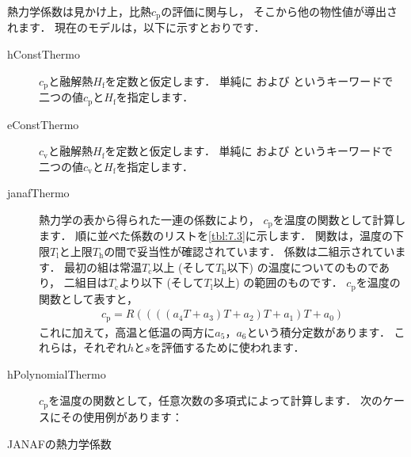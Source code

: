熱力学係数は見かけ上，比熱$c_{\mathrm{p}}$の評価に関与し，
そこから他の物性値が導出されます．
現在のモデルは，以下に示すとおりです．
\begin{description}
 \item[hConstThermo]
            $c_{\mathrm{p}}$と融解熱$H_{\mathrm{f}}$を定数と仮定します．
            単純に
%
%
            および
%
%
            というキーワードで
            二つの値$c_{\mathrm{p}}$と$H_{\mathrm{f}}$を指定します．
 \item[eConstThermo]
            $c_{\mathrm{v}}$と融解熱$H_{\mathrm{f}}$を定数と仮定します．
            単純に
%
%
            および
%
%
            というキーワードで
            二つの値$c_{\mathrm{v}}$と$H_{\mathrm{f}}$を指定します．
 \item[janafThermo]
            熱力学の表から得られた一連の係数により，
            $c_{\mathrm{p}}$を温度の関数として計算します．
            順に並べた係数のリストを\autoref{tbl:7.3}に示します．
            関数は，温度の下限$T_{\mathrm{l}}$と上限$T_{\mathrm{h}}$の間で妥当性が確認されています．
            係数は二組示されています．
            最初の組は常温$T_{\mathrm{c}}$以上 (そして$T_{\mathrm{h}}$以下) の温度についてのものであり，
            二組目は$T_{\mathrm{c}}$より以下 (そして$T_{\mathrm{l}}$以上) の範囲のものです．
            $c_{\mathrm{p}}$を温度の関数として表すと，
\begin{align}
 \label{eq:7.1}
 c_{\mathrm{p}} = R((((a_{4}T + a_{3})T + a_{2})T + a_{1})T + a_{0})
\end{align}
            これに加えて，高温と低温の両方に$a_{5}$，$a_{6}$という積分定数があります．
            これらは，それぞれ$h$と$s$を評価するために使われます．
 \item[hPolynomialThermo]
            $c_{\mathrm{p}}$を温度の関数として，任意次数の多項式によって計算します．
            次のケースにその使用例があります：\\
            \hfil{}
\end{description}


\begin{table}[ht]
 
 \caption{JANAFの熱力学係数}
 \label{tbl:7.3}
\end{table}


